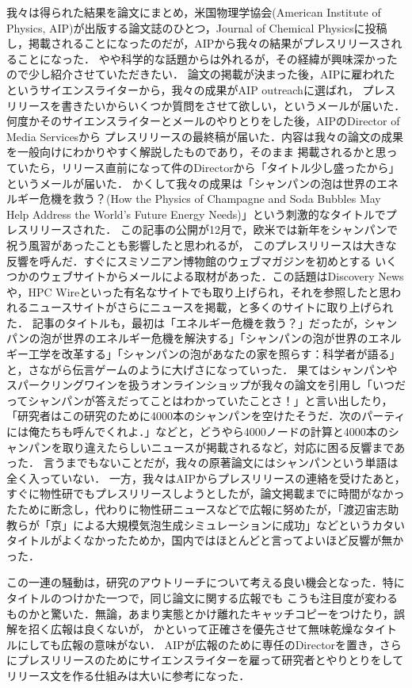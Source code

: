 \documentclass[topics,b5paper,papersize,twocolumn]{jsarticle}
\begin{document}
我々は得られた結果を論文にまとめ，米国物理学協会(American Institute of Physics, AIP)が出版する論文誌のひとつ，Journal of Chemical Physicsに投稿し，掲載されることになったのだが，AIPから我々の結果がプレスリリースされることになった．
やや科学的な話題からは外れるが，その経緯が興味深かったので少し紹介させていただきたい．
論文の掲載が決まった後，AIPに雇われたというサイエンスライターから，我々の成果がAIP outreachに選ばれ，
プレスリリースを書きたいからいくつか質問をさせて欲しい，というメールが届いた．
何度かそのサイエンスライターとメールのやりとりをした後，AIPのDirector of Media Servicesから
プレスリリースの最終稿が届いた．内容は我々の論文の成果を一般向けにわかりやすく解説したものであり，そのまま
掲載されるかと思っていたら，リリース直前になって件のDirectorから「タイトル少し盛ったから」というメールが届いた．
かくして我々の成果は「シャンパンの泡は世界のエネルギー危機を救う？(How the Physics of Champagne and Soda Bubbles May Help Address the World's Future Energy Needs)」という刺激的なタイトルでプレスリリースされた\cite{AIP}．
この記事の公開が12月で，欧米では新年をシャンパンで祝う風習があったことも影響したと思われるが，
このプレスリリースは大きな反響を呼んだ．すぐにスミソニアン博物館のウェブマガジン\cite{Smithsonian}を初めとする
いくつかのウェブサイトからメールによる取材があった．この話題はDiscovery Newsや，HPC Wire\cite{hpcwire}といった有名なサイトでも取り上げられ，それを参照したと思われるニュースサイトがさらにニュースを掲載，と多くのサイトに取り上げられた．
記事のタイトルも，最初は「エネルギー危機を救う？」だったが，シャンパンの泡が世界のエネルギー危機を解決する」「シャンパンの泡が世界のエネルギー工学を改革する」「シャンパンの泡があなたの家を照らす：科学者が語る」と，さながら伝言ゲームのように大げさになっていった．
果てはシャンパンやスパークリングワインを扱うオンラインショップが我々の論文を引用し「いつだってシャンパンが答えだってことはわかっていたことさ！」と言い出したり，「研究者はこの研究のために4000本のシャンパンを空けたそうだ．次のパーティには俺たちも呼んでくれよ．」などと，どうやら4000ノードの計算と4000本のシャンパンを取り違えたらしいニュースが掲載されるなど，対応に困る反響まであった．
言うまでもないことだが，我々の原著論文にはシャンパンという単語は全く入っていない．
一方，我々はAIPからプレスリリースの連絡を受けたあと，すぐに物性研でもプレスリリースしようとしたが，論文掲載までに時間がなかったために断念し，代わりに物性研ニュースなどで広報に努めたが，「渡辺宙志助教らが「京」による大規模気泡生成シミュレーションに成功」などというカタいタイトルがよくなかったためか，国内ではほとんどと言ってよいほど反響が無かった．

この一連の騒動は，研究のアウトリーチについて考える良い機会となった．特にタイトルのつけかた一つで，同じ論文に関する広報でも
こうも注目度が変わるものかと驚いた．無論，あまり実態とかけ離れたキャッチコピーをつけたり，誤解を招く広報は良くないが，
かといって正確さを優先させて無味乾燥なタイトルにしても広報の意味がない．
AIPが広報のために専任のDirectorを置き，さらにプレスリリースのためにサイエンスライターを雇って研究者とやりとりをして
リリース文を作る仕組みは大いに参考になった．
\end{document}
